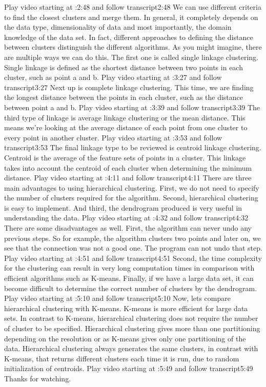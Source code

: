 Play video starting at :2:48 and follow transcript2:48
We can use different criteria to find the closest clusters and merge them. In general, it completely depends on the data type, dimensionality of data and most importantly, the domain knowledge of the data set. In fact, different approaches to defining the distance between clusters distinguish the different algorithms. As you might imagine, there are multiple ways we can do this. The first one is called single linkage clustering. Single linkage is defined as the shortest distance between two points in each cluster, such as point a and b.
Play video starting at :3:27 and follow transcript3:27
Next up is complete linkage clustering. This time, we are finding the longest distance between the points in each cluster, such as the distance between point a and b.
Play video starting at :3:39 and follow transcript3:39
The third type of linkage is average linkage clustering or the mean distance. This means we're looking at the average distance of each point from one cluster to every point in another cluster.
Play video starting at :3:53 and follow transcript3:53
The final linkage type to be reviewed is centroid linkage clustering. Centroid is the average of the feature sets of points in a cluster. This linkage takes into account the centroid of each cluster when determining the minimum distance.
Play video starting at :4:11 and follow transcript4:11
There are three main advantages to using hierarchical clustering. First, we do not need to specify the number of clusters required for the algorithm. Second, hierarchical clustering is easy to implement. And third, the dendrogram produced is very useful in understanding the data.
Play video starting at :4:32 and follow transcript4:32
There are some disadvantages as well. First, the algorithm can never undo any previous steps. So for example, the algorithm clusters two points and later on, we see that the connection was not a good one. The program can not undo that step.
Play video starting at :4:51 and follow transcript4:51
Second, the time complexity for the clustering can result in very long computation times in comparison with efficient algorithms such as K-means. Finally, if we have a large data set, it can become difficult to determine the correct number of clusters by the dendrogram.
Play video starting at :5:10 and follow transcript5:10
Now, lets compare hierarchical clustering with K-means. K-means is more efficient for large data sets. In contrast to K-means, hierarchical clustering does not require the number of cluster to be specified. Hierarchical clustering gives more than one partitioning depending on the resolution or as K-means gives only one partitioning of the data. Hierarchical clustering always generates the same clusters, in contrast with K-means, that returns different clusters each time it is run, due to random initialization of centroids.
Play video starting at :5:49 and follow transcript5:49
Thanks for watching.


